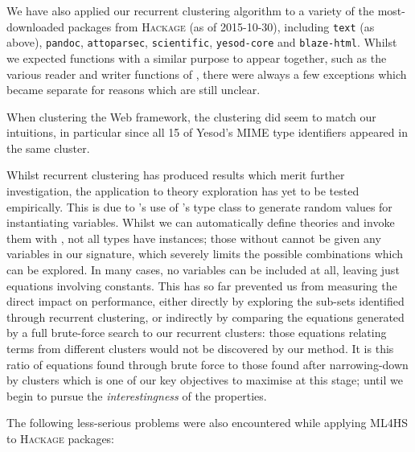 We have also applied our recurrent clustering algorithm to a variety of the
most-downloaded packages from \textsc{Hackage} (as of 2015-10-30), including
\texttt{text} (as above), \texttt{pandoc}, \texttt{attoparsec},
\texttt{scientific}, \texttt{yesod-core} and \texttt{blaze-html}. Whilst we
expected functions with a similar purpose to appear together, such as the
various reader and writer functions of , there were always a few
exceptions which became separate for reasons which are still unclear.

When clustering the  Web framework, the clustering did seem to match
our intuitions, in particular since all 15 of Yesod's MIME type identifiers
appeared in the same cluster.

Whilst recurrent clustering has produced results which merit further
investigation, the application to theory exploration has yet to be tested
empirically. This is due to \qspec{}'s use of \qcheck{}'s  type
class to generate random values for instantiating variables. Whilst we can
automatically define \qspec{} theories and invoke them with , not
all types have  instances; those without cannot be given any
variables in our signature, which severely limits the possible combinations
which can be explored. In many cases, no variables can be included at all,
leaving just equations involving constants. This has so far prevented us from
measuring the direct impact on \qspec{} performance, either directly by
exploring the sub-sets identified through recurrent clustering, or indirectly by
comparing the equations generated by a full brute-force search to our recurrent
clusters: those equations relating terms from different clusters would not be
discovered by our method. It is this ratio of equations found through brute
force to those found after narrowing-down by clusters which is one of our key
objectives to maximise at this stage; until we begin to pursue the
\emph{interestingness} of the properties.

The following less-serious problems were also encountered while applying
\textsc{ML4HS} to \textsc{Hackage} packages:

